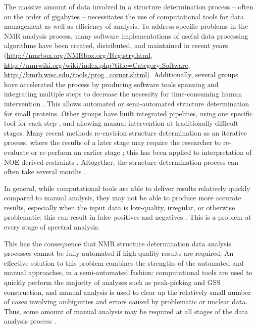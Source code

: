 The massive amount of data involved in a structure determination process --
often on the order of gigabytes -- necessitates the use of computational
tools for data management as well as efficiency of analysis.  To address
specific problems in the NMR analysis process, many software implementations 
of useful data processing algorithms have been created, distributed, and 
maintained in recent years 
(\url{http://nmrbox.org/NMRbox.org/Registry.html}, 
\url{http://nmrwiki.org/wiki/index.php?title=Category:Software}, 
\url{http://bmrb.wisc.edu/tools/prog\_corner.shtml}).  
Additionally, several groups have 
accelerated the process by producing software tools spanning and integrating 
multiple steps to decrease the necessity for time-consuming human intervention
\cite{abacus_assignment}.
This allows automated or semi-automated structure determination for small 
proteins.  Other groups have built integrated pipelines, using one specific 
tool for each step \cite{baran2004automated, sail_flya}, 
and allowing manual intervention at traditionally 
difficult stages.  Many recent methods re-envision structure determination 
as an iterative process, where the results of a later stage may require the 
researcher to re-evaluate or re-perform an earlier stage \cite{cyana2004}; 
this has been applied to interpretation of NOE-derived 
restraints \cite{aria2003}.  Altogether, the structure determination 
process can often take several months \cite{guerry2011automated}.

In general, while computational tools are able to deliver results relatively 
quickly compared to manual analysis, they may not be able to produce more 
accurate results, especially when the input data is low-quality, irregular, or 
otherwise problematic; this can result in false positives and negatives
\cite{williamson2009automated}.  This is a problem at every stage of spectral
analysis.

This has the consequence that NMR structure determination data analysis 
processes cannot be fully automated if high-quality results are required.  
An effective solution to this problem combines the strengths of the automated 
and manual approaches, in a semi-automated fashion:  computational tools are 
used to quickly perform the majority of analyses such as peak-picking and 
GSS construction, and manual analysis is used to clear up the 
relatively small number of cases involving ambiguities and errors caused 
by problematic or unclear data.  Thus, some amount of manual analysis may 
be required at all stages of the data analysis process 
\cite{guntert2009automated, williamson2009automated}.   

